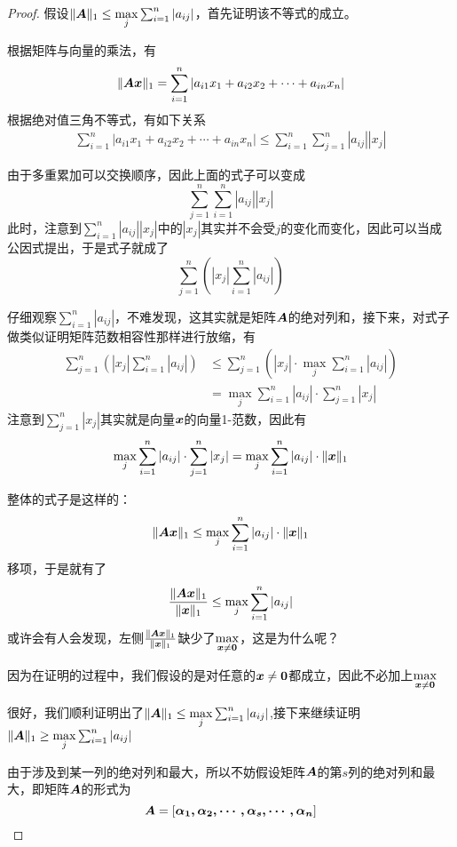 \documentclass[12pt, a4paper, oneside, UTF8]{ctexbook}
\begin{document}
\begin{proof}

    假设$\Vert\boldsymbol{A}\Vert_1\leq\max\limits_{j}\sum_{i=1}^{n}|a_{ij}|$，首先证明该不等式的成立。

    根据矩阵与向量的乘法，有\[\Vert\boldsymbol{Ax}\Vert_1=\sum_{i=1}^{n}|a_{i1}x_1+a_{i2}x_2+\cdots+a_{in}x_n|\]
    根据绝对值三角不等式，有如下关系\[
    \begin{aligned}
        \sum_{i=1}^{n}|a_{i1}x_1+a_{i2}x_2+\cdots+a_{in}x_n|\leq\sum_{i=1}^{n}\sum_{j=1}^{n}|a_{ij}||x_j|
    \end{aligned}
    \]

    由于多重累加可以交换顺序，因此上面的式子可以变成\[\sum_{j=1}^{n}\sum_{i=1}^{n}|a_{ij}||x_j|\]
    此时，注意到$\sum_{i=1}^{n}|a_{ij}||x_j|$中的$|x_j|$其实并不会受$j$的变化而变化，因此可以当成公因式提出，于是式子就成了\[\sum_{j=1}^{n}(|x_j|\sum_{i=1}^{n}|a_{ij}|)\]

    仔细观察$\sum_{i=1}^{n}|a_{ij}|$，不难发现，这其实就是矩阵$\boldsymbol{A}$的绝对列和，接下来，对式子做类似证明矩阵范数相容性那样进行放缩，有
    \[
    \begin{aligned}
        \sum_{j=1}^{n}(|x_j|\sum_{i=1}^{n}|a_{ij}|)&\leq\sum_{j=1}^{n}(|x_j|\cdot\max\limits_{j}\sum_{i=1}^{n}|a_{ij}|)\\
        &=\max\limits_j\sum_{i=1}^{n}|a_{ij}|\cdot\sum_{j=1}^{n}|x_j|
    \end{aligned}
    \]
    注意到$\sum_{j=1}^{n}|x_j|$其实就是向量$\boldsymbol{x}$的向量1-范数，因此有\[\max\limits_j\sum_{i=1}^{n}|a_{ij}|\cdot\sum_{j=1}^{n}|x_j|=\max\limits_j\sum_{i=1}^{n}|a_{ij}|\cdot\Vert\boldsymbol{x}\Vert_1\]

    整体的式子是这样的：
    \[\Vert\boldsymbol{Ax}\Vert_1\leq\max\limits_j\sum_{i=1}^{n}|a_{ij}|\cdot\Vert\boldsymbol{x}\Vert_1\]
    移项，于是就有了\[\frac{\Vert\boldsymbol{Ax}\Vert_1}{\Vert\boldsymbol{x}\Vert_1}\leq\max\limits_j\sum_{i=1}^{n}|a_{ij}|\]
    或许会有人会发现，左侧$\frac{\Vert\boldsymbol{Ax}\Vert_1}{\Vert\boldsymbol{x}\Vert_1}$缺少了$\max\limits_{\boldsymbol{x}\neq\boldsymbol{0}}$，这是为什么呢？
    
    因为在证明的过程中，我们假设的是对任意的$\boldsymbol{x}\neq\boldsymbol{0}$都成立，因此不必加上$\max\limits_{\boldsymbol{x}\neq\boldsymbol{0}}$

    很好，我们顺利证明出了$\Vert\boldsymbol{A}\Vert_1\leq\max\limits_{j}\sum_{i=1}^{n}|a_{ij}|$,接下来继续证明$\Vert\boldsymbol{A}\Vert_1\geq\max\limits_{j}\sum_{i=1}^{n}|a_{ij}|$

    由于涉及到某一列的绝对列和最大，所以不妨假设矩阵$\boldsymbol{A}$的第$s$列的绝对列和最大，即矩阵$\boldsymbol{A}$的形式为\[\boldsymbol{A}=[\boldsymbol{\alpha_1, \alpha_2, \cdots,\alpha_s,\cdots,\alpha_n}]\]


\end{proof}
\end{document}
